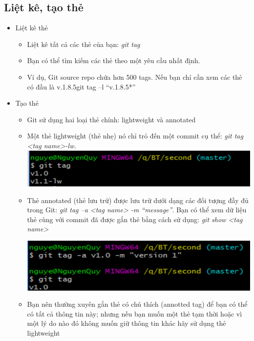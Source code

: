 \documentclass[12pt,a4paper]{report}
\begin{document}
\subsection{Liệt kê, tạo thẻ}
\begin{itemize}
\item Liệt kê thẻ
	\begin{itemize}
		\item Liệt kê tất cả các thẻ của bạn: \textit{git tag}
		\item Bạn có thể tìm kiếm các thẻ theo một yêu cầu nhất định. 
		\item Ví dụ, Git source repo chứa hơn 500 tags. Nếu bạn chỉ cần xem các thẻ có đầu là v.1.8.5git tag –l “v.1.8.5*”
	\end{itemize}
\item Tạo thẻ
	\begin{itemize}
		\item Git sử dụng hai loại thẻ chính: lightweight và annotated
		\item Một thẻ lightweight (thẻ nhẹ) nó chỉ trỏ đến một commit cụ thể: {\it git tag <tag name>-lw.}
	\includegraphics[width=0.8\linewidth]{screenshot042}

	\label{fig:screenshot042}

		\item Thẻ annotated (thẻ lưu trữ) được lưu trữ dưới dạng các đối tượng đầy đủ trong Git: {\it git tag –a <tag name> -m “message”}. Bạn có thể xem dữ liệu thẻ cùng với commit đã được gắn thẻ bằng cách sử dụng: {\it git show <tag name>}

	\includegraphics[width=0.8\linewidth]{screenshot043}

	\label{fig:screenshot043}

		\item Bạn nên thường xuyên gắn thẻ có chú thích (annotted tag) để bạn có thể có tất cả thông tin này; nhưng nếu bạn muốn một thẻ tạm thời hoặc vì một lý do nào đó không muốn giữ thông tin khác hãy sử dụng thẻ lightweight
\end{itemize}
\end{itemize}
\end{document}
